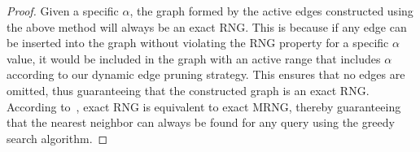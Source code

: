 \begin{proof}
\label{lemma:drng_nearest_neighbor_proof} 
{Given a specific $\alpha$, the graph formed by the active edges constructed using the above method will always be an exact RNG. This is because if any edge can be inserted into the graph without violating the RNG property for a specific $\alpha$ value, it would be included in the graph with an active range that includes $\alpha$ according to our dynamic edge pruning strategy. This ensures that no edges are omitted, thus guaranteeing that the constructed graph is an exact RNG. According to~\cite{fu2019fast, wang2021comprehensive}, exact RNG is equivalent to exact MRNG, thereby guaranteeing that the nearest neighbor can always be found for any query using the greedy search algorithm.}


\end{proof}


